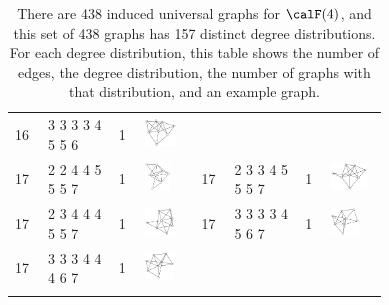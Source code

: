 \begin{footnotesize}
\begin{longtable}{
        m{0.05\linewidth} m{0.15\linewidth} m{0.05\linewidth} m{0.12\linewidth} |
        m{0.05\linewidth} m{0.15\linewidth} m{0.05\linewidth} m{0.12\linewidth}
    }
16 & 3 3 3 3 4 5 5 6 & 1 & \includegraphics[height=0.7151cm]{15-universal-graphs/img/degree-sequences-example-graphs/graph-4-8-151}\\
17 & 2 2 4 4 5 5 5 7 & 1 & \includegraphics[height=0.7151cm]{15-universal-graphs/img/degree-sequences-example-graphs/graph-4-8-152} &
17 & 2 3 3 4 5 5 5 7 & 1 & \includegraphics[height=0.7151cm]{15-universal-graphs/img/degree-sequences-example-graphs/graph-4-8-153}\\
17 & 2 3 4 4 4 5 5 7 & 1 & \includegraphics[height=0.7151cm]{15-universal-graphs/img/degree-sequences-example-graphs/graph-4-8-154} &
17 & 3 3 3 3 4 5 6 7 & 1 & \includegraphics[height=0.7151cm]{15-universal-graphs/img/degree-sequences-example-graphs/graph-4-8-155}\\
17 & 3 3 3 4 4 4 6 7 & 1 & \includegraphics[height=0.7151cm]{15-universal-graphs/img/degree-sequences-example-graphs/graph-4-8-156}\\
\bottomrule
\caption{There are 438 induced universal graphs for $\calF(4)$, and this set of
    438 graphs has 157 distinct degree distributions.  For each degree distribution,
    this table shows the number of edges, the
    degree distribution, the number of graphs with that distribution,
    and an example graph.}
\label{tab:f4-degree-distributions}
\end{longtable}
\end{footnotesize}

